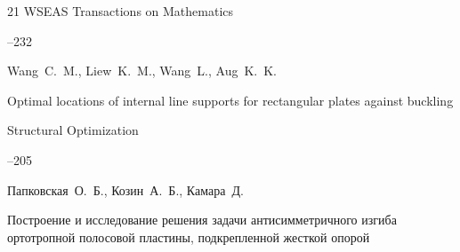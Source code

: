 \begin{thebibliography}{21}
\jour WSEAS Transactions on Mathematics




--232










\by Wang~C.~M., Liew~K.~M., Wang~L., Aug~K.~K.

\paper Optimal locations of internal line supports for rectangular plates against buckling

\jour Structural Optimization




--205













\by Папковская~О.~Б., Козин~А.~Б., Камара~Д.

\paper Построение и исследование решения задачи антисимметричного изгиба ортотропной полосовой пластины, подкрепленной жесткой опорой


\end{thebibliography}
